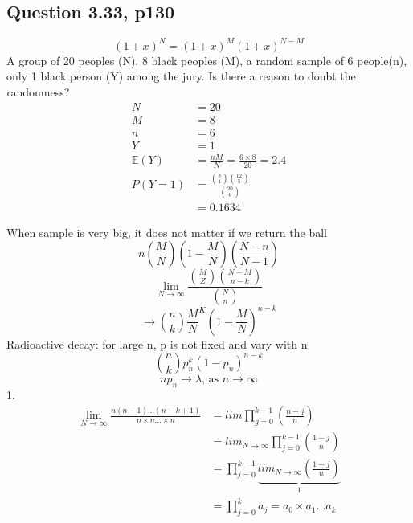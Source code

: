 \documentclass{article}
\begin{document}
\subsection{Question 3.33, p130}
\[
    (1+x)^{N} = (1+x)^M(1+x)^{N-M}
\]
A group of 20 peoples (N), 8 black peoples (M), a random sample of 6 people(n), only 1 black person (Y) among the jury. Is there a reason to doubt the randomness?
\begin{align*}
    N              & = 20                                                 \\
    M              & = 8                                                  \\
    n              & = 6                                                  \\
    Y              & = 1                                                  \\
    \mathbb{E} (Y) & = \frac{nM}{N} = \frac{6 \times 8}{20} = 2.4         \\
    P(Y = 1)       & = \frac{\binom{8}{1} \binom{12}{5} }{\binom{20}{6} } \\
                   & =0.1634
\end{align*}

When sample is very big, it does not matter if we return the ball
\[
    n (\frac{M}{N} )(1-\frac{M}{N} )(\frac{N-n}{N-1} )
\]
\[
    \lim _{N \rightarrow \infty} \frac{\binom{M}{Z} \binom{N-M}{n-k}}{\binom{N}{n}}
\]
\[
    \rightarrow \binom{n}{k} \frac{M}{N} ^{K} (1-\frac{M}{N} )^{n-k}
\]
Radioactive decay: for large n, p is not fixed and vary with n
\[
    \binom{n}{k} p ^{k}_{n}(1-p_n)^{n-k}
\]
\[
    np_n \rightarrow \lambda \text{, as } n \rightarrow \infty
\]
1.
\begin{align*}
    \lim _{N \rightarrow \infty} \frac{n(n-1) \dots (n-k+1)}{n \times n \dots \times n}
     & = lim \prod _{g=0} ^{k-1} (\frac{n-j}{n} )                                            \\
     & = lim  _{N \rightarrow \infty}  \prod _{j=0} ^{k-1} (\frac{1-j}{n} )                  \\
     & = \prod _{j=0} ^{k-1} \underbrace{lim  _{N \rightarrow \infty}  (\frac{1-j}{n} )}_{1} \\
     & = \prod _{j=0} ^{k} a _j = a_0 \times a_1 \dots a_k
\end{align*}
\end{document}
